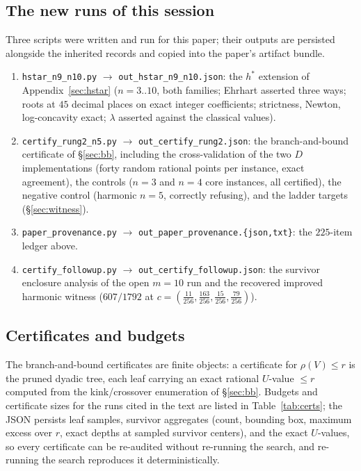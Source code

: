 \subsection{The new runs of this session}

Three scripts were written and run for this paper; their outputs are
persisted alongside the inherited records and copied into the paper's
artifact bundle.

\begin{enumerate}[leftmargin=1.6em,itemsep=2pt]
\item \texttt{hstar\_n9\_n10.py} $\to$ \texttt{out\_hstar\_n9\_n10.json}:
the $h^*$ extension of Appendix~\ref{sec:hstar} ($n=3..10$, both
families; Ehrhart asserted three ways; roots at $45$ decimal places on
exact integer coefficients; strictness, Newton, log-concavity exact;
$\lambda$ asserted against the classical values).
\item \texttt{certify\_rung2\_n5.py} $\to$
\texttt{out\_certify\_rung2.json}: the branch-and-bound certificate of
\S\ref{sec:bb}, including the cross-validation of the two $D$
implementations (forty random rational points per instance, exact
agreement), the controls ($n=3$ and $n=4$ core instances, all
certified), the negative control (harmonic $n=5$, correctly refusing),
and the ladder targets (\S\ref{sec:witness}).
\item \texttt{paper\_provenance.py} $\to$
\texttt{out\_paper\_provenance.\{json,txt\}}: the $225$-item ledger
above.
\item \texttt{certify\_followup.py} $\to$
\texttt{out\_certify\_followup.json}: the survivor enclosure analysis
of the open $m=10$ run and the recovered improved harmonic witness
($607/1792$ at $c=(\tfrac{11}{256},\tfrac{163}{256},
\tfrac{15}{256},\tfrac{79}{256})$).
\end{enumerate}

\subsection{Certificates and budgets}

The branch-and-bound certificates are finite objects: a certificate for
$\rho(V)\le r$ is the pruned dyadic tree, each leaf carrying an exact
rational $U$-value $\le r$ computed from the kink/crossover enumeration
of \S\ref{sec:bb}. Budgets and certificate sizes for the runs cited in
the text are listed in Table~\ref{tab:certs}; the JSON persists leaf
samples, survivor aggregates (count, bounding box, maximum excess over
$r$, exact depths at sampled survivor centers), and the exact
$U$-values, so every certificate can be re-audited without re-running
the search, and re-running the search reproduces it deterministically.

